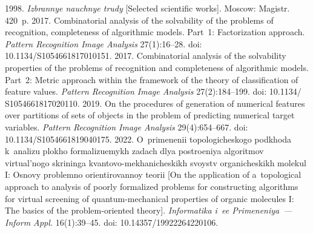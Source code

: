   \begin{multicols}{2}

\renewcommand{\bibname}{\protect\rmfamily References}

{\small\frenchspacing
 {\baselineskip=11.6pt
 \begin{thebibliography}{9}
 
 \vspace*{-3pt}
 
 1998. \textit{Izbrannye nauchnye trudy} [Selected scientific works]. 
Moscow: Magistr. 420~p.
 2017. Combinatorial analysis of the solvability of the 
problems of recognition, completeness of algorithmic models. Part~1: Factorization approach. 
\textit{Pattern Recognition Image Analysis} 27(1):16--28. doi: 10.1134/S1054661817010151.
 2017. Combinatorial analysis of the solvability 
properties of the problems of recognition and completeness of algorithmic models. Part~2: Metric 
approach within the framework of the theory of classification of feature values. \textit{Pattern Recognition Image Analysis}
 27(2):184--199. doi: 10.1134/ S1054661817020110.
 2019. On the procedures of generation of numerical 
features over partitions of sets of objects in the problem of predicting numerical target variables. 
\textit{Pattern Recognition Image Analysis} 29(4):654--667. doi: 10.1134/S1054661819040175.
 2022. O~primenenii topologicheskogo podkhoda k~analizu plokho 
formalizuemykh zadach dlya postroeniya algoritmov virtual'nogo skrininga  
kvantovo-mekhanicheskikh svoystv organicheskikh molekul I: Osno\-vy problemno 
orientirovannoy teorii [On the application of a~topological approach to analysis of poorly 
formalized problems for constructing algorithms for virtual screening of quantum-mechanical 
properties of organic molecules I: The basics of the problem-oriented theory]. \textit{Informatika 
i~ee Primeneniya~--- Inform Appl.} 16(1):39--45. doi: 10.14357/19922264220106.



\end{thebibliography}}}
\end{multicols}

